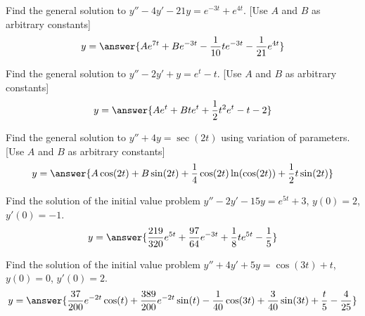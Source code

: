 \documentclass{ximera}
\begin{document}
\begin{exercise}
    Find the general solution to $y'' - 4y' - 21y = e^{-3t} + e^{4t}$. [Use $A$ and $B$ as arbitrary constants]
    \[
        y=\answer{A e^{7t} + Be^{-3t} - \frac{1}{10}te^{-3t} - \frac{1}{21}e^{4t}}
    \]
\end{exercise}

\begin{exercise}
    Find the general solution to $y'' - 2y' + y = e^t - t$. [Use $A$ and $B$ as arbitrary constants]
    \[
        y=\answer{A e^t + Bte^t + \frac{1}{2}t^2e^t - t - 2}
    \]
\end{exercise}

\begin{exercise}
    Find the general solution to $y'' + 4y = \sec(2t)$ using variation of parameters. [Use $A$ and $B$ as arbitrary constants]
    \[
        y=\answer{A \cos(2t) + B\sin(2t) + \frac{1}{4}\cos(2t)\ln(\cos(2t)) + \frac{1}{2}t\sin(2t)}
    \]
\end{exercise}

\begin{exercise}
    Find the solution of the initial value problem $y'' - 2y' - 15y = e^{5t} + 3$, $y(0) = 2$, $y'(0) = -1$.
    \[
        y=\answer{\frac{219}{320}e^{5t} + \frac{97}{64}e^{-3t} + \frac{1}{8}te^{5t} - \frac{1}{5}}
    \]
\end{exercise}

\begin{exercise}
    Find the solution of the initial value problem $y'' + 4y' + 5y = \cos(3t) + t$, $y(0) = 0$, $y'(0) = 2$.
        \[
            y=\answer{\frac{37}{200}e^{-2t}\cos(t) + \frac{389}{200}e^{-2t}\sin(t) - \frac{1}{40}\cos(3t) + \frac{3}{40}\sin(3t) + \frac{t}{5} - \frac{4}{25}}
        \]
\end{exercise}
\end{document}
